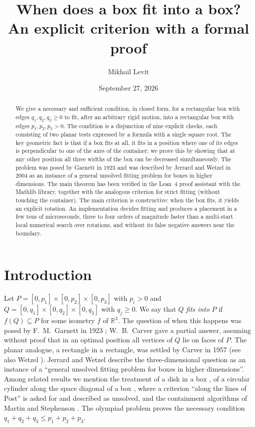 \documentclass[11pt]{article}
\title{When does a box fit into a box?\\ An explicit criterion with a formal proof}
\author{Mikhail Levit}
\date{September 27, 2026}
\theoremstyle{definition}
\theoremstyle{remark}
\newcommand{\R}{\mathbb{R}}
\begin{document}
\maketitle

\begin{abstract}
We give a necessary and sufficient condition, in closed form, for a rectangular box with edges
$q_1,q_2,q_3\ge 0$ to fit, after an arbitrary rigid motion, into a rectangular box with edges
$p_1,p_2,p_3>0$. The condition is a disjunction of nine explicit checks, each consisting of two
planar tests expressed by a formula with a single square root. The key geometric fact is that if a
box fits at all, it fits in a position where one of its edges is perpendicular to one of the axes of
the container; we prove this by showing that at any other position all three widths of the box can be
decreased simultaneously. The problem was posed by Garnett in 1923 and was described by Jerrard and
Wetzel in 2004 as an instance of a general unsolved fitting problem for boxes in
higher dimensions. The main theorem has been verified in the Lean~4 proof assistant with the Mathlib
library, together with the analogous criterion for strict fitting (without touching the container).
The main criterion is constructive: when the box fits, it yields an explicit rotation. An implementation decides fitting and produces a
placement in a few tens of microseconds, three to four orders of magnitude faster than a multi-start
local numerical search over rotations, and without its false negative answers near the boundary.
\end{abstract}

\section{Introduction}

Let $P=[0,p_1]\times[0,p_2]\times[0,p_3]$ with $p_i>0$ and $Q=[0,q_1]\times[0,q_2]\times[0,q_3]$ with
$q_j\ge 0$. We say that $Q$ \emph{fits into} $P$ if $f(Q)\subseteq P$ for some isometry $f$ of $\R^3$.
The question of when this happens was posed by F.~M.~Garnett in 1923
\cite{Garnett1923}; W.~B.~Carver \cite{Carver1925} gave a partial answer, assuming without proof that
in an optimal position all vertices of $Q$ lie on faces of $P$. The planar analogue, a rectangle in a
rectangle, was settled by Carver in 1957 \cite{Carver1957} (see also Wetzel \cite{Wetzel2000}).
Jerrard and Wetzel \cite[p.~22]{JerrardWetzel2004} describe the three-dimensional question as an
instance of a ``general unsolved fitting problem for boxes in higher dimensions''. Among related
results we mention the treatment of a disk in a box \cite{AlexanderWetzel2005}, of a circular
cylinder along the space diagonal of a box \cite{JSSW2006}, where a criterion ``along the lines of
Post'' \cite{Post1993} is asked for and described as unsolved, and the containment algorithms of
Martin and Stephenson \cite{MartinStephenson1989}. The olympiad problem \cite{Kvant1999} proves the
necessary condition $q_1+q_2+q_3\le p_1+p_2+p_3$.
\end{document}
